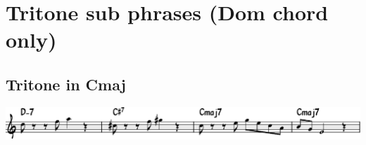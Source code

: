 \documentclass[11pt]{article}
\begin{document}
\section{Tritone sub phrases (Dom chord only)}
\label{sec:org1ca94b7}

\subsection{Tritone in Cmaj}
\label{sec:orgdbdd0a3}
\begin{center}
\includegraphics[width=.98\linewidth]{tritone-c-maj.pdf}
\end{center}
\end{document}
